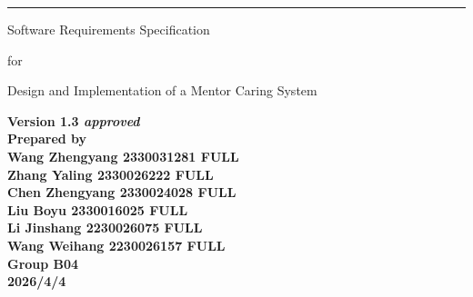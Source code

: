 \documentclass[a4paper,12pt]{article}
\begin{document}
\begin{titlepage}
\thispagestyle{empty}
\vspace*{0.5cm}

\noindent\rule{\textwidth}{3pt}

\vspace{1.5cm}

{\fontsize{26}{31}\selectfont\bfseries\raggedright
Software Requirements Specification\par}

\vspace{0.8cm}

{\fontsize{14}{17}\selectfont\bfseries\raggedright
for\par}

\vspace{0.8cm}

{\fontsize{26}{31}\selectfont\bfseries\raggedright
Design and Implementation of a Mentor Caring System\par}

\vfill

\begin{flushright}
{\fontsize{12}{15}\selectfont\bfseries
Version 1.3 \textit{approved}\\[1cm]
Prepared by\\
Wang Zhengyang 2330031281 FULL\\
Zhang Yaling 2330026222 FULL\\
Chen Zhengyang 2330024028 FULL\\
Liu Boyu 2330016025 FULL\\
Li Jinshang 2230026075 FULL\\
Wang Weihang 2230026157 FULL\\[0.8cm]
Group B04\\[0.5cm]
2026/4/4
}
\end{flushright}

\vspace{1cm}
\end{titlepage}

\newpage
\thispagestyle{fancy}
\setcounter{page}{2}
\renewcommand{\thepage}{\roman{page}}
\end{document}
